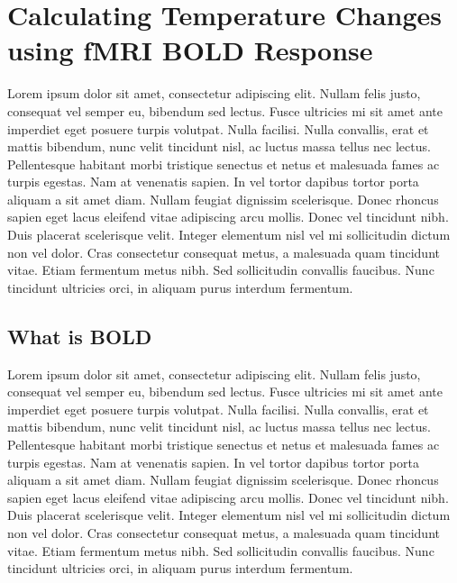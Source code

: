 \chapter{Calculating Temperature Changes using fMRI BOLD Response}

Lorem ipsum dolor sit amet, consectetur adipiscing elit. Nullam felis justo, consequat vel semper eu, bibendum sed lectus. Fusce ultricies mi sit amet ante imperdiet eget posuere turpis volutpat. Nulla facilisi. Nulla convallis, erat et mattis bibendum, nunc velit tincidunt nisl, ac luctus massa tellus nec lectus. Pellentesque habitant morbi tristique senectus et netus et malesuada fames ac turpis egestas. Nam at venenatis sapien. In vel tortor dapibus tortor porta aliquam a sit amet diam. Nullam feugiat dignissim scelerisque. Donec rhoncus sapien eget lacus eleifend vitae adipiscing arcu mollis. Donec vel tincidunt nibh. Duis placerat scelerisque velit. Integer elementum nisl vel mi sollicitudin dictum non vel dolor. Cras consectetur consequat metus, a malesuada quam tincidunt vitae. Etiam fermentum metus nibh. Sed sollicitudin convallis faucibus. Nunc tincidunt ultricies orci, in aliquam purus interdum fermentum. \cite{sotero2011}

\section{What is BOLD}
Lorem ipsum dolor sit amet, consectetur adipiscing elit. Nullam felis justo, consequat vel semper eu, bibendum sed lectus. Fusce ultricies mi sit amet ante imperdiet eget posuere turpis volutpat. Nulla facilisi. Nulla convallis, erat et mattis bibendum, nunc velit tincidunt nisl, ac luctus massa tellus nec lectus. Pellentesque habitant morbi tristique senectus et netus et malesuada fames ac turpis egestas. Nam at \cite{galiana} venenatis sapien. In vel tortor dapibus tortor porta aliquam a sit amet diam. Nullam feugiat dignissim scelerisque. Donec rhoncus sapien eget lacus eleifend vitae adipiscing arcu mollis. Donec vel tincidunt nibh. Duis placerat scelerisque velit. Integer elementum nisl vel mi sollicitudin dictum non vel dolor. Cras consectetur consequat metus, a malesuada quam tincidunt vitae. Etiam fermentum metus nibh. Sed sollicitudin convallis faucibus. Nunc tincidunt ultricies orci, in aliquam purus interdum fermentum. 

